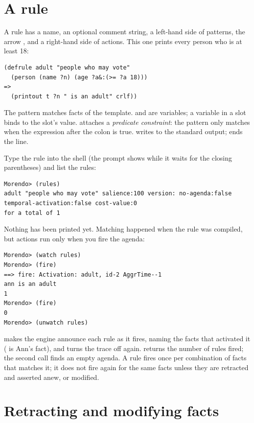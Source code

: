 \section{A rule}

A rule has a name, an optional comment string, a left-hand side of
patterns, the arrow \fn{=>}, and a right-hand side of actions. This one
prints every person who is at least 18:

\begin{lstlisting}
(defrule adult "people who may vote"
  (person (name ?n) (age ?a&:(>= ?a 18)))
=>
  (printout t ?n " is an adult" crlf))
\end{lstlisting}

The pattern  matches facts of the  template.
 and  are variables; a variable in a slot binds to the slot's
value. \fn{\&:} attaches a \emph{predicate constraint}: the pattern only
matches when the expression after the colon is true.  writes
to the standard output;  ends the line.

Type the rule into the shell (the prompt shows  while it waits for
the closing parentheses) and list the rules:

\begin{lstlisting}[style=shell]
Morendo> (rules)
adult "people who may vote" salience:100 version: no-agenda:false temporal-activation:false cost-value:0
for a total of 1
\end{lstlisting}

Nothing has been printed yet. Matching happened when the rule was
compiled, but actions run only when you fire the agenda:

\begin{lstlisting}[style=shell]
Morendo> (watch rules)
Morendo> (fire)
==> fire: Activation: adult, id-2 AggrTime--1
ann is an adult
1
Morendo> (fire)
0
Morendo> (unwatch rules)
\end{lstlisting}

 makes the engine announce each rule as it fires, naming
the facts that activated it ( is Ann's fact), and 
turns the trace off again.  returns the
number of rules fired; the second call finds an empty agenda. A rule fires
once per combination of facts that matches it; it does not fire again for
the same facts unless they are retracted and asserted anew, or modified.

\section{Retracting and modifying facts}

